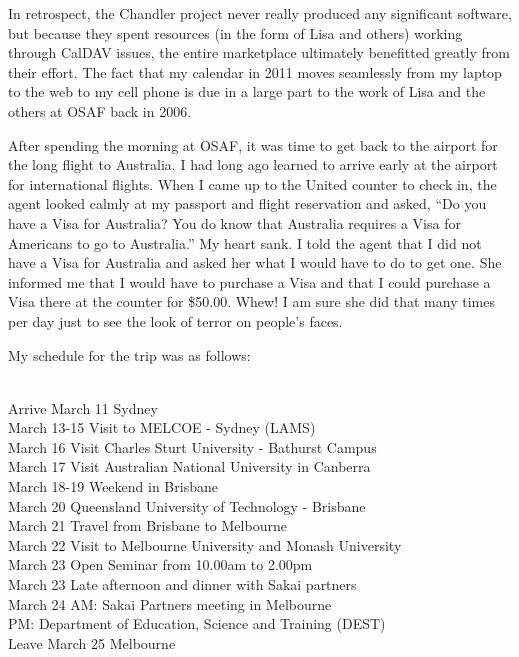 \documentclass[12pt]{book}
\begin{document}
In retrospect, the Chandler project never really
produced any significant software, but because
they spent resources (in the form of Lisa and others)
working through CalDAV issues, the entire marketplace
ultimately benefitted greatly from their effort.
The fact that my calendar in 2011 moves seamlessly from
my laptop to the web to my cell phone is
due in a large part to the work of Lisa and
the others at OSAF back in 2006.

After spending the morning at OSAF, it was time
to get back to the airport for the long flight
to Australia.  I had long ago learned to arrive
early at the airport for international
flights.  When I came up to the United counter
to check in, the agent looked calmly at my
passport and flight reservation and asked,
``Do you have a Visa for Australia?  You do
know that Australia requires a Visa for Americans
to go to Australia.''  My heart sank.  I
told the agent that I did not have a Visa for
Australia and asked her what I would have to
do to get one.  She informed me that I would have to
purchase a Visa and
that I could purchase a Visa
there at the counter for \$50.00.  Whew!
I am sure she did that many times per day
just to see the look of terror on people's faces.

My schedule for the trip was as follows:\\
\\
\begin{sf}
Arrive March 11 Sydney\\
March 13-15 Visit to MELCOE - Sydney (LAMS)\\
March 16 Visit Charles Sturt University - Bathurst Campus\\
March 17 Visit Australian National University in Canberra\\
March 18-19 Weekend in Brisbane\\
March 20 Queensland University of Technology - Brisbane\\
March 21 Travel from Brisbane to Melbourne\\
March 22 Visit to Melbourne University and Monash University\\
March 23 Open Seminar  from 10.00am to 2.00pm\\
March 23 Late afternoon and dinner with Sakai partners \\
March 24 AM: Sakai Partners meeting in Melbourne \\
         PM: Department of Education, Science and Training (DEST) \\
Leave March 25 Melbourne\\
\end{sf}
\end{document}
